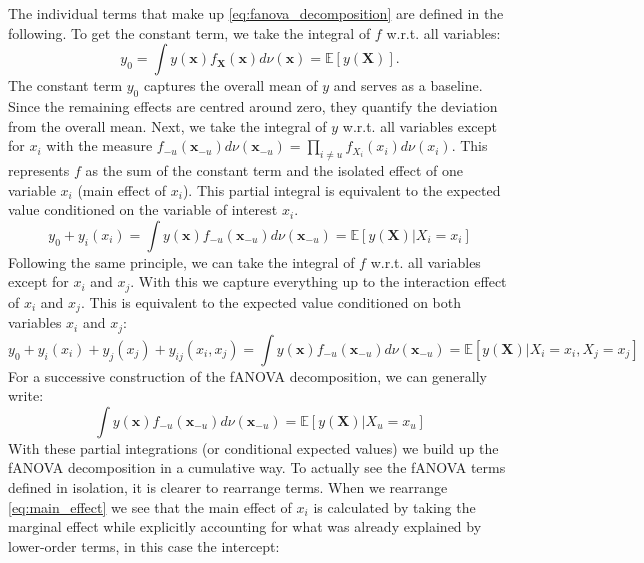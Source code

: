 The individual terms that make up \autoref{eq:fanova_decomposition} are defined in the following.
To get the constant term, we take the integral of $f$ w.r.t. all variables:
\begin{equation}
    y_{0} = \int y(\boldsymbol{x}) f_{\boldsymbol{X}}(\boldsymbol{x}) d\nu(\boldsymbol{x}) = \mathbb{E}[y(\boldsymbol{X})].
    \label{eq:intercept}
\end{equation}
The constant term $y_0$ captures the overall mean of $y$ and serves as a baseline. Since the remaining effects are centred around zero, they quantify the deviation from the overall mean.  Next, we take the integral of $y$ w.r.t. all variables except for $x_i$ with the measure
$f_{-u}(\boldsymbol{x}_{-u}) d\nu (\boldsymbol{x}_{-u})= \prod_{i \neq u} f_{X_i}(x_i)d\nu (x_i)$. This represents $f$ as the sum of the constant term and the isolated effect of one variable $x_i$ (main effect of $x_i$). This partial integral is equivalent to the expected value conditioned on the variable of interest $x_i$.
\begin{equation}
    y_0 + y_i(x_i) = \int y(\boldsymbol{x}) f_{-u}(\boldsymbol{x}_{-u}) d\nu (\boldsymbol{x}_{-u}) = \mathbb{E}[y(\boldsymbol{X}) | X_i = x_i]
    \label{eq:main_effect}
\end{equation}
Following the same principle, we can take the integral of $f$ w.r.t. all variables except for $x_i$ and $x_j$. With this we capture everything up to the interaction effect of $x_i$ and $x_j$. This is equivalent to the expected value conditioned on both variables $x_i$ and $x_j$:
\begin{equation}
    y_0 + y_i(x_i) + y_j(x_j) + y_{ij}(x_i,x_j) = \int y(\boldsymbol{x}) f_{-u}(\boldsymbol{x}_{-u}) d\nu (\boldsymbol{x}_{-u}) = \mathbb{E}[y(\boldsymbol{X}) | X_i = x_i, X_j = x_j]
    \label{eq:interaction_effects}
\end{equation}
For a successive construction of the fANOVA decomposition, we can generally write:
\begin{equation}
    \int y(\boldsymbol{x}) f_{-u}(\boldsymbol{x}_{-u}) d\nu (\boldsymbol{x}_{-u}) = \mathbb{E}[y(\boldsymbol{X}) | X_u = x_u]
    \label{eq:fanova_component}
\end{equation}
With these partial integrations (or conditional expected values) we build up the fANOVA decomposition in a cumulative way. To actually see the fANOVA terms defined in isolation, it is clearer to rearrange terms. When we rearrange \autoref{eq:main_effect} we see that the main effect of $x_i$ is calculated by taking the marginal effect while explicitly accounting for what was already explained by lower-order terms, in this case the intercept:
